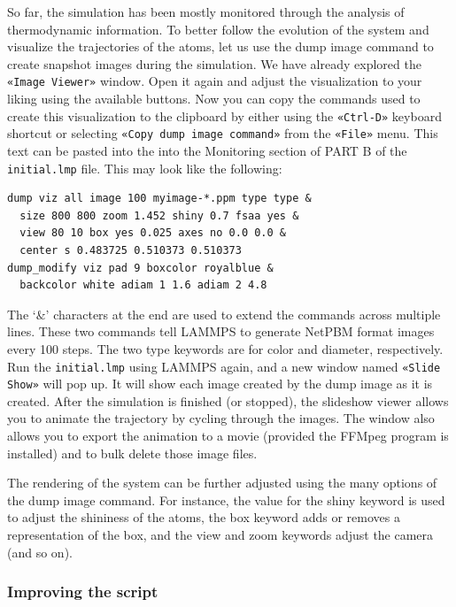 \documentclass[9pt,tutorial]{livecoms}
\newcommand{\lmpcmd}[1]{\colorbox{listing}{\textcolor{command}{\small{#1}}}} %
\newcommand{\flecmd}[1]{\textcolor{command}{\texttt{#1}}} %
\newcommand{\guicmd}[1]{\textcolor{command}{\texttt{«#1»}}} %
\begin{document}
So far, the simulation has been mostly monitored through the analysis of
thermodynamic information.  To better follow the evolution of the system
and visualize the trajectories of the atoms, let us use the \lmpcmd{dump
  image} command to create snapshot images during the simulation.  We
have already explored the \guicmd{Image Viewer} window.  Open it again
and adjust the visualization to your liking using the available buttons.
Now you can copy the commands used to create this visualization to the
clipboard by either using the \guicmd{Ctrl-D} keyboard shortcut or
selecting \guicmd{Copy dump image command} from the \guicmd{File} menu.
This text can be pasted into the into the \lmpcmd{Monitoring} section
of \lmpcmd{PART B} of the \flecmd{initial.lmp} file.  This may look like
the following:
\begin{lstlisting}
dump viz all image 100 myimage-*.ppm type type &
  size 800 800 zoom 1.452 shiny 0.7 fsaa yes &
  view 80 10 box yes 0.025 axes no 0.0 0.0 &
  center s 0.483725 0.510373 0.510373
dump_modify viz pad 9 boxcolor royalblue &
  backcolor white adiam 1 1.6 adiam 2 4.8
\end{lstlisting}
{\color{blue}The `$\&$' characters at the end are used to extend the
  commands across multiple lines. These two commands tell} LAMMPS to
generate NetPBM format images every 100
steps.  The two \lmpcmd{type} keywords are for \lmpcmd{color} and
\lmpcmd{diameter}, respectively.  Run the \flecmd{initial.lmp} using
LAMMPS again, and a new window named \guicmd{Slide Show} will pop up.
It will show each image created by the \lmpcmd{dump image} as it is
created. After the simulation is finished (or stopped), the slideshow
viewer allows you to animate the trajectory by cycling through the
images.  The window also allows you to export the animation to a movie
(provided the FFMpeg program is installed) and to bulk delete those
image files.

The rendering of the system can be further adjusted using the many
options of the \lmpcmd{dump image} command.  For instance, the value for the
\lmpcmd{shiny} keyword is used to adjust the shininess of the atoms, the
\lmpcmd{box} keyword adds or removes a representation of the box, and
the \lmpcmd{view} and \lmpcmd{zoom} keywords adjust the camera (and so
on).

\subsubsection{Improving the script}
\end{document}
